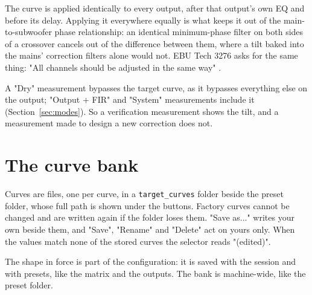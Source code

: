 The curve is applied identically to every output, after that output's own EQ and before its delay. Applying it everywhere equally is what keeps it out of the main-to-subwoofer phase relationship: an identical minimum-phase filter on both sides of a crossover cancels out of the difference between them, where a tilt baked into the mains' correction filters alone would not. EBU Tech 3276 asks for the same thing: "All channels should be adjusted in the same way" \cite{EBU3276}.

A "Dry" measurement bypasses the target curve, as it bypasses everything else on the output; "Output + FIR" and "System" measurements include it (Section~\ref{sec:modes}). So a verification measurement shows the tilt, and a measurement made to design a new correction does not.


\section{The curve bank}\label{sec:targetbank}
Curves are files, one per curve, in a \texttt{target\_curves} folder beside the preset folder, whose full path is shown under the buttons. Factory curves cannot be changed and are written again if the folder loses them. "Save as..." writes your own beside them, and "Save", "Rename" and "Delete" act on yours only. When the values match none of the stored curves the selector reads "(edited)".

The shape in force is part of the configuration: it is saved with the session and with presets, like the matrix and the outputs. The bank is machine-wide, like the preset folder.

